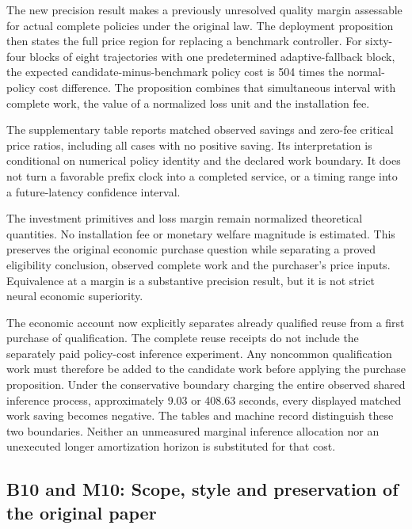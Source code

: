 The new precision result makes a previously unresolved quality margin
assessable for actual complete policies under the original law. The
deployment proposition then states the full price region for replacing a
benchmark controller. For sixty-four blocks of eight trajectories with
one predetermined adaptive-fallback block, the expected
candidate-minus-benchmark policy cost is 504 times the normal-policy
cost difference. The proposition combines that simultaneous interval
with complete work, the value of a normalized loss unit and the
installation fee.

The supplementary table reports matched observed savings and zero-fee
critical price ratios, including all cases with no positive saving. Its
interpretation is conditional on numerical policy identity and the
declared work boundary. It does not turn a favorable prefix clock into a
completed service, or a timing range into a future-latency confidence
interval.

The investment primitives and loss margin remain normalized theoretical
quantities. No installation fee or monetary welfare magnitude is
estimated. This preserves the original economic purchase question while
separating a proved eligibility conclusion, observed complete work and
the purchaser's price inputs. Equivalence at a margin is a substantive
precision result, but it is not strict neural economic superiority.

The economic account now explicitly separates already qualified reuse
from a first purchase of qualification. The complete reuse receipts do
not include the separately paid policy-cost inference experiment. Any
noncommon qualification work must therefore be added to the candidate
work before applying the purchase proposition. Under the conservative
boundary charging the entire observed shared inference process,
approximately 9.03 or 408.63 seconds, every displayed matched work
saving becomes negative. The tables and machine record distinguish these
two boundaries. Neither an unmeasured marginal inference allocation nor
an unexecuted longer amortization horizon is substituted for that cost.

\hypertarget{b10-and-m10-scope-style-and-preservation-of-the-original-paper}{%
\subsection{B10 and M10: Scope, style and preservation of the original
paper}\label{b10-and-m10-scope-style-and-preservation-of-the-original-paper}}

